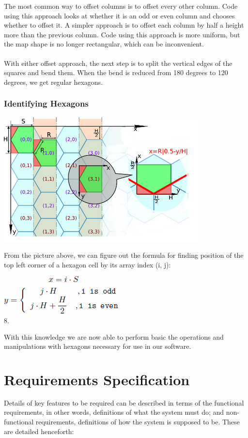 \documentclass[10pt,a4paper]{article}
\begin{document}
The most common way \cite{gdmath} to offset columns is to offset every other column. Code using this approach looks at whether it is an odd or even column and chooses whether to offset it. A simpler approach is to offset each column by half a height more than the previous column. Code using this approach is more uniform, but the map shape is no longer rectangular, which can be inconvenient.\\
\\
With either offset approach, the next step is to split the vertical edges of the squares and bend them. When the bend is reduced from 180 degrees to 120 degrees, we get regular hexagons.
\subsubsection{Identifying Hexagons}
\begin{center}
\includegraphics[scale=0.5]{image10.png}\\
\end{center}
From the picture above, we can figure out the formula for finding position of the top left corner of a hexagon cell by its array index (i, j):\\
\begin{center}
\includegraphics[scale=0.5]{image16.png}\\8.
\end{center}
With this knowledge we are now able to perform basic the operations and manipulations with hexagons necessary for use in our software.

\section{Requirements Specification}
Details of key features to be required can be described in terms of the functional requirements, in other words, definitions of what the system must do; and non-functional requirements, definitions of how the system is supposed to be. These are detailed henceforth:
\end{document}
